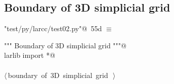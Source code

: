 \documentclass[11pt,oneside]{article}	%
\begin{document}
\subsection{Boundary of 3D simplicial grid}

\begin{flushleft} \small
\begin{minipage}{\linewidth} \label{scrap98}
\protect{}\verb@"test/py/larcc/test02.py"@\nobreak\ {\footnotesize 55d }$\equiv$
\vspace{-1ex}
\begin{list}{}{} \item
\mbox{}\verb@""" Boundary of 3D simplicial grid """@\\
\mbox{}\verb@from larlib import *@\\
\mbox{}\verb@@\\
\mbox{}\verb@@\hbox{$\langle\,$boundary of 3D simplicial grid\nobreak\ {\footnotesize {}}$\,\rangle$}\verb@@\\
\mbox{}\verb@@{\NWsep}
\end{list}
\vspace{-2ex}
\end{minipage}\\[4ex]
\end{flushleft}
\end{document}
